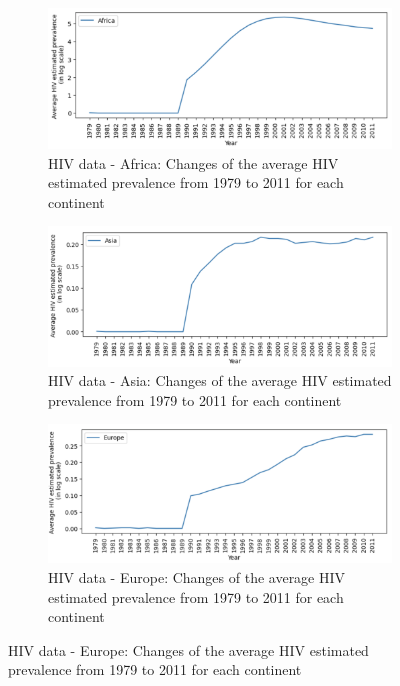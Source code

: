 \documentclass[UTF8, letter]{article}
\begin{document}
\begin{figure}
	\centering
	\begin{subfigure}[b]{1\textwidth}
		\centering
		\includegraphics[width=\linewidth]{output_12.png}
		\caption{HIV data - Africa: Changes of the average HIV estimated prevalence from 1979 to 2011 for each continent}
		\label{fig:line1}		
	\end{subfigure}
	\begin{subfigure}[b]{1\textwidth}
		\centering
		\includegraphics[width=\linewidth]{output_13.png}
		\caption{HIV data - Asia: Changes of the average HIV estimated prevalence from 1979 to 2011 for each continent}
		\label{fig:line1}		
	\end{subfigure}
	\begin{subfigure}[b]{1\textwidth}
		\centering
		\includegraphics[width=\linewidth]{output_14.png}
		\caption{HIV data - Europe: Changes of the average HIV estimated prevalence from 1979 to 2011 for each continent}
		\label{fig:line1}		
	\end{subfigure}				
\end{figure}
\end{document}
